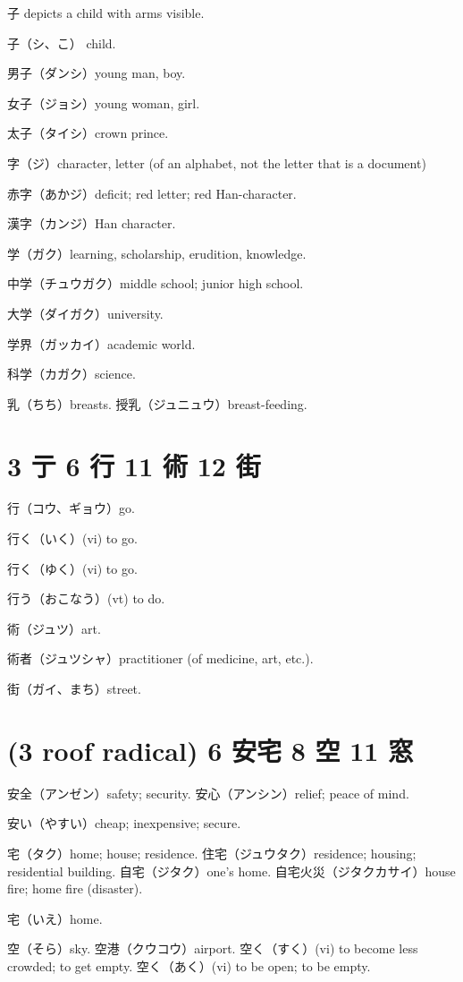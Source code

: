 子 depicts a child with arms visible.

子（シ、こ） child.

男子（ダンシ）young man, boy.

女子（ジョシ）young woman, girl.

太子（タイシ）crown prince.

字（ジ）character, letter (of an alphabet, not the letter that is a document)

赤字（あかジ）deficit; red letter; red Han-character.

漢字（カンジ）Han character.

学（ガク）learning, scholarship, erudition, knowledge.

中学（チュウガク）middle school; junior high school.

大学（ダイガク）university.

学界（ガッカイ）academic world.

科学（カガク）science.

乳（ちち）breasts.
授乳（ジュニュウ）breast-feeding.

\section{3 亍 6 行 11 術 12 街}

行（コウ、ギョウ）go.

行く（いく）(vi) to go.

行く（ゆく）(vi) to go.

行う（おこなう）(vt) to do.

術（ジュツ）art.

術者（ジュツシャ）practitioner (of medicine, art, etc.).

街（ガイ、まち）street.

\section{(3 roof radical) 6 安宅 8 空 11 窓}

安全（アンゼン）safety; security.
安心（アンシン）relief; peace of mind.

安い（やすい）cheap; inexpensive; secure.

宅（タク）home; house; residence.
住宅（ジュウタク）residence; housing; residential building.
自宅（ジタク）one's home.
自宅火災（ジタクカサイ）house fire; home fire (disaster).

宅（いえ）home.

空（そら）sky.
空港（クウコウ）airport.
空く（すく）(vi) to become less crowded; to get empty.
空く（あく）(vi) to be open; to be empty.


